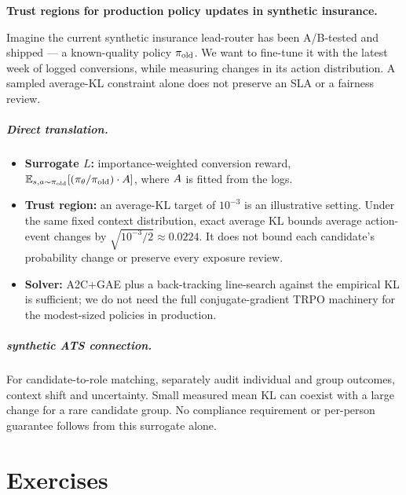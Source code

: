 \documentclass[11pt,oneside]{scrbook}
\begin{document}
\begin{matching}
\textbf{Trust regions for production policy updates in synthetic insurance.}

Imagine the current synthetic insurance lead-router has been A/B-tested and shipped --- a known-quality policy $\pi_\text{old}$. We want to fine-tune it with the latest week of logged conversions, while measuring changes in its action distribution. A sampled average-KL
constraint alone does not preserve an SLA or a fairness review.

\paragraph{Direct translation.}
\begin{itemize}
  \item \textbf{Surrogate $L$:} importance-weighted conversion reward, $\mathbb{E}_{s,a\sim\pi_\text{old}}[(\pi_\theta/\pi_\text{old}) \cdot A]$, where $A$ is fitted from the logs.
  \item \textbf{Trust region:} an average-KL target of $10^{-3}$ is an
        illustrative setting. Under the same fixed context distribution,
        exact average KL bounds average action-event changes by
        $\sqrt{10^{-3}/2}\approx0.0224$. It does not bound each
        candidate's probability change or preserve every exposure review.

  \item \textbf{Solver:} A2C+GAE plus a back-tracking line-search against the empirical KL is sufficient; we do not need the full conjugate-gradient TRPO machinery for the modest-sized policies in production.
\end{itemize}

\paragraph{synthetic ATS connection.}
For candidate-to-role matching, separately audit individual and group
outcomes, context shift and uncertainty. Small measured mean KL can coexist
with a large change for a rare candidate group. No compliance requirement
or per-person guarantee follows from this surrogate alone.

\end{matching}

\chapter{Exercises}
\end{document}
